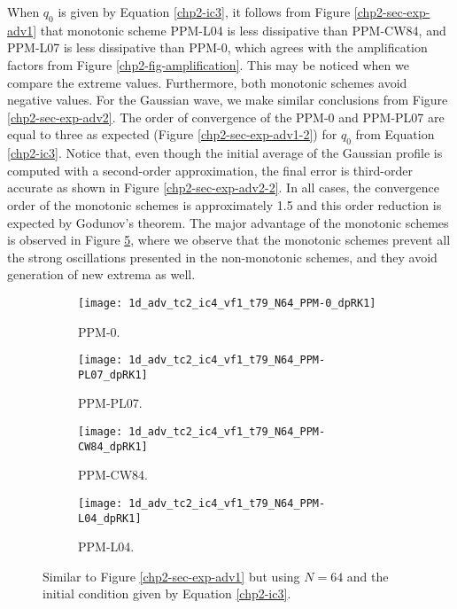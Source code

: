 \newpage
When $q_0$ is given by Equation \eqref{chp2-ic3}, it follows from Figure
\ref{chp2-sec-exp-adv1} that monotonic scheme PPM-L04 is less dissipative than PPM-CW84,
and PPM-L07 is less dissipative than PPM-0, which agrees with the amplification factors
from Figure \ref{chp2-fig-amplification}.
This may be noticed when we compare the extreme values. 
Furthermore, both monotonic schemes avoid negative values.
For the Gaussian wave, we make similar conclusions from Figure \ref{chp2-sec-exp-adv2}.
The order of convergence of the PPM-0 and PPM-PL07 are equal to three as expected 
(Figure \ref{chp2-sec-exp-adv1-2}) for $q_0$ from Equation \eqref{chp2-ic3}.
Notice that, even though the initial average of the  Gaussian profile is computed with a
second-order approximation, the final error is third-order accurate as shown in Figure
\ref{chp2-sec-exp-adv2-2}. In all cases, the convergence order of the monotonic schemes
is approximately 1.5 and this order reduction is expected by Godunov's theorem. 
The major advantage of the monotonic schemes is observed in Figure \ref{chp2-sec-exp-adv3},
where we observe that the monotonic schemes prevent all the strong oscillations
presented in the non-monotonic schemes, and they avoid generation of new extrema as well.
\begin{figure}[!htb]
  \centering
  \begin{subfigure}{0.49\textwidth}
    \centering
			\texttt{[image: 1d\_adv\_tc2\_ic4\_vf1\_t79\_N64\_PPM-0\_dpRK1]}
			\caption{PPM-0.\label{chp2-sec-exp-adv3-a}}
  \end{subfigure}
  \begin{subfigure}{0.49\textwidth}
    \centering
			\texttt{[image: 1d\_adv\_tc2\_ic4\_vf1\_t79\_N64\_PPM-PL07\_dpRK1]}
			\caption{PPM-PL07.\label{chp2-sec-exp-adv3-b}}
  \end{subfigure}

  \begin{subfigure}{0.49\textwidth}
    \centering
		\texttt{[image: 1d\_adv\_tc2\_ic4\_vf1\_t79\_N64\_PPM-CW84\_dpRK1]}
    \caption{PPM-CW84.\label{chp2-sec-exp-adv3-c}}
  \end{subfigure}
  \begin{subfigure}{0.49\textwidth}
    \centering
			\texttt{[image: 1d\_adv\_tc2\_ic4\_vf1\_t79\_N64\_PPM-L04\_dpRK1]}
      \caption{PPM-L04.\label{chp2-sec-exp-adv3-d}}
  \end{subfigure} 
	\caption{ Similar to Figure \ref{chp2-sec-exp-adv1} but using $N=64$
	and the initial condition given by Equation \eqref{chp2-ic3}.\label{chp2-sec-exp-adv3}}
\end{figure}

